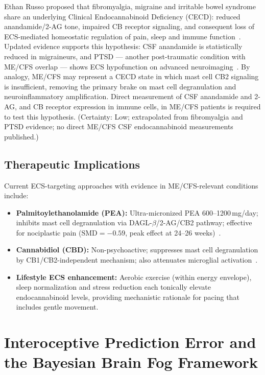 \begin{speculation}
\label{spec:ch15-cecd}
Ethan Russo proposed that fibromyalgia, migraine and irritable bowel syndrome share an underlying Clinical Endocannabinoid Deficiency (CECD): reduced anandamide/2-AG tone, impaired CB receptor signaling, and consequent loss of ECS-mediated homeostatic regulation of pain, sleep and immune function~\cite{Russo2004CECD}. Updated evidence supports this hypothesis: CSF anandamide is statistically reduced in migraineurs, and PTSD --- another post-traumatic condition with ME/CFS overlap --- shows ECS hypofunction on advanced neuroimaging~\cite{Russo2016CECDReconsidered}. By analogy, ME/CFS may represent a CECD state in which mast cell CB2 signaling is insufficient, removing the primary brake on mast cell degranulation and neuroinflammatory amplification. Direct measurement of CSF anandamide and 2-AG, and CB receptor expression in immune cells, in ME/CFS patients is required to test this hypothesis. (Certainty: Low; extrapolated from fibromyalgia and PTSD evidence; no direct ME/CFS CSF endocannabinoid measurements published.)
\end{speculation}

\subsection{Therapeutic Implications}

Current ECS-targeting approaches with evidence in ME/CFS-relevant conditions include:
\begin{itemize}
  \item \textbf{Palmitoylethanolamide (PEA):} Ultra-micronized PEA 600--1200\,mg/day; inhibits mast cell degranulation via DAGL-$\beta$/2-AG/CB2 pathway; effective for nociplastic pain ($\text{SMD} = -0.59$, peak effect at 24--26 weeks)~\cite{LangIlievich2023PEA}.
  \item \textbf{Cannabidiol (CBD):} Non-psychoactive; suppresses mast cell degranulation by CB1/CB2-independent mechanism; also attenuates microglial activation~\cite{YangCBD2024MastCell}.
  \item \textbf{Lifestyle ECS enhancement:} Aerobic exercise (within energy envelope), sleep normalization and stress reduction each tonically elevate endocannabinoid levels, providing mechanistic rationale for pacing that includes gentle movement.
\end{itemize}


\section{Interoceptive Prediction Error and the Bayesian Brain Fog Framework}
\label{sec:ch15-interoception}

